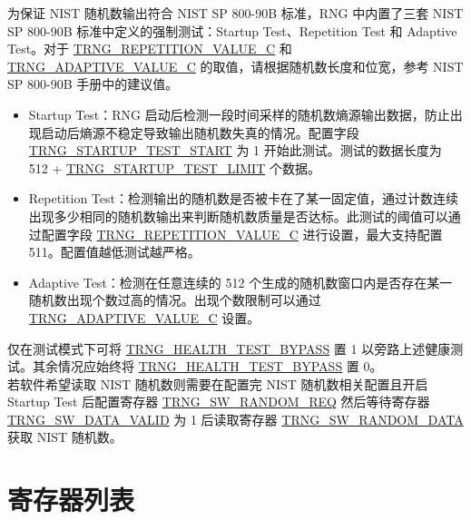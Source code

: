 \documentclass[main\_\_CN.tex]{subfiles}
\begin{document}
为保证 NIST 随机数输出符合 NIST SP 800-90B 标准，RNG 中内置了三套 NIST SP 800-90B 标准中定义的强制测试：Startup Test、Repetition Test 和 Adaptive Test。对于 \hyperref[fielddesc:TRNGREPETITIONVALUEC]{TRNG\_REPETITION\_VALUE\_C} 和 \hyperref[fielddesc:TRNGADAPTIVEVALUEC]{TRNG\_ADAPTIVE\_VALUE\_C} 的取值，请根据随机数长度和位宽，参考 NIST SP 800-90B 手册中的建议值。
\begin{itemize}
    \item Startup Test：RNG 启动后检测一段时间采样的随机数熵源输出数据，防止出现启动后熵源不稳定导致输出随机数失真的情况。配置字段 \hyperref[fielddesc:TRNGSTARTUPTESTSTART]{TRNG\_STARTUP\_TEST\_START} 为 1 开始此测试。测试的数据长度为 512 + \hyperref[fielddesc:TRNGSTARTUPTESTLIMIT]{TRNG\_STARTUP\_TEST\_LIMIT} 个数据。
    \item Repetition Test：检测输出的随机数是否被卡在了某一固定值，通过计数连续出现多少相同的随机数输出来判断随机数质量是否达标。此测试的阈值可以通过配置字段 \hyperref[fielddesc:TRNGREPETITIONVALUEC]{TRNG\_REPETITION\_VALUE\_C} 进行设置，最大支持配置 511。配置值越低测试越严格。
    \item Adaptive Test：检测在任意连续的 512 个生成的随机数窗口内是否存在某一随机数出现个数过高的情况。出现个数限制可以通过 \hyperref[fielddesc:TRNGADAPTIVEVALUEC]{TRNG\_ADAPTIVE\_VALUE\_C} 设置。
\end{itemize}

仅在测试模式下可将 \hyperref[fielddesc:TRNGHEALTHTESTBYPASS]{TRNG\_HEALTH\_TEST\_BYPASS} 置 1 以旁路上述健康测试。其余情况应始终将 \hyperref[fielddesc:TRNGHEALTHTESTBYPASS]{TRNG\_HEALTH\_TEST\_BYPASS} 置 0。
\\
若软件希望读取 NIST 随机数则需要在配置完 NIST 随机数相关配置且开启 Startup Test 后配置寄存器 \hyperref[fielddesc:TRNGSWRANDOMREQ]{TRNG\_SW\_RANDOM\_REQ} 然后等待寄存器 \hyperref[fielddesc:TRNGSWDATAVALID]{TRNG\_SW\_DATA\_VALID} 为 1 后读取寄存器 \hyperref[fielddesc:TRNGSWRANDOMDATA]{TRNG\_SW\_RANDOM\_DATA} 获取 NIST 随机数。






\newpage

\hypertarget{rng-reg-summ}{}
\section{寄存器列表}
\label{sec:rng-reg-summ}
\end{document}
